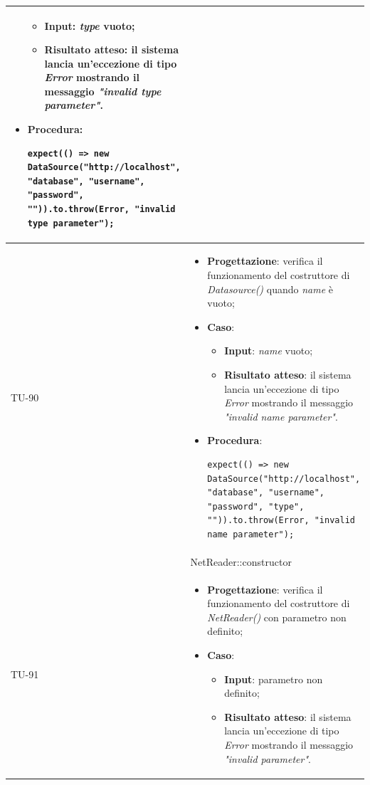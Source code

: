 \begin{longtable}{|C{1.5cm}|C{14.5cm}|}
\begin{itemize}
	\begin{itemize}
		\item \textbf{Input}: \emph{type} vuoto;
		\item \textbf{Risultato atteso}: il sistema lancia un'eccezione di tipo \emph{Error} mostrando il messaggio \emph{"invalid type parameter"}.
	\end{itemize}
	\item \textbf{Procedura}:
	\begin{lstlisting}
expect(() => new DataSource("http://localhost", "database", "username", "password", "")).to.throw(Error, "invalid type parameter");
	\end{lstlisting}
\end{itemize}\\
\hline
{TU-90} &
\begin{itemize}
	\item \textbf{Progettazione}: verifica il funzionamento del costruttore di \emph{Datasource()} quando \emph{name} è vuoto;
	\item \textbf{Caso}: 
	\begin{itemize}
		\item \textbf{Input}: \emph{name} vuoto;
		\item \textbf{Risultato atteso}: il sistema lancia un'eccezione di tipo \emph{Error} mostrando il messaggio \emph{"invalid name parameter"}.
	\end{itemize}
	\item \textbf{Procedura}:
	\begin{lstlisting}
expect(() => new DataSource("http://localhost", "database", "username", "password", "type", "")).to.throw(Error, "invalid name parameter");
	\end{lstlisting}
\end{itemize}\\
\hline
{} & NetReader::constructor
\\ \hline
{TU-91} &
\begin{itemize}
	\item \textbf{Progettazione}: verifica il funzionamento del costruttore di \emph{NetReader()} con parametro non definito;
	\item \textbf{Caso}: 
	\begin{itemize}
		\item \textbf{Input}: parametro non definito;
		\item \textbf{Risultato atteso}: il sistema lancia un'eccezione di tipo \emph{Error} mostrando il messaggio \emph{"invalid parameter"}.

\end{itemize}
\end{itemize}
\end{longtable}
